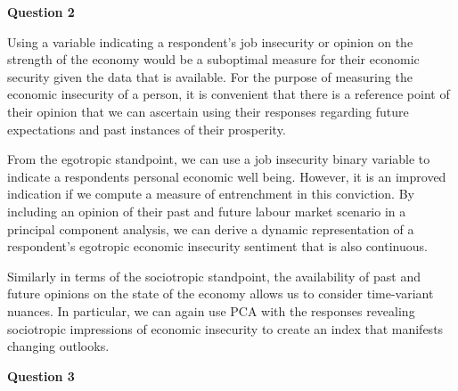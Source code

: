 \documentclass[11pt]{article}
\begin{document}
\textbf{Question 2}

Using a variable indicating a respondent's job insecurity or opinion on the strength of the economy would be a suboptimal measure for their economic security given the data that is available. For the purpose of measuring the economic insecurity of a person, it is convenient that there is a reference point of their opinion that we can ascertain using their responses regarding future expectations and past instances of their prosperity.

From the egotropic standpoint, we can use a job insecurity binary variable to indicate a respondents personal economic well being. However, it is an improved indication if we compute a measure of entrenchment in this conviction. By including an opinion of their past and future labour market scenario in a principal component analysis, we can derive a dynamic representation of a respondent's egotropic economic insecurity sentiment that is also continuous.

Similarly in terms of the sociotropic standpoint, the availability of past and future opinions on the state of the economy allows us to consider time-variant nuances. In particular, we can again use PCA with the responses revealing sociotropic impressions of economic insecurity to create an index that manifests changing outlooks.           

\textbf{Question 3}
\end{document}
